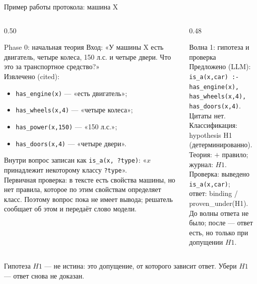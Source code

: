 \documentclass[aspectratio=169,11pt]{beamer}
\newcommand{\Logos}[1]{\textcolor{logoscolor}{#1}}
\newcommand{\Hyp}[1]{\textcolor{hypocolor}{#1}}
\begin{document}
\begin{frame}[shrink=4]{Пример работы протокола: машина X}
  \footnotesize
  \begin{columns}[T,onlytextwidth]
    \begin{column}{0.50\textwidth}
      \begin{block}{Phase 0: начальная теория}
        Вход: «У машины X есть двигатель, четыре колеса,
        150 л.с. и четыре двери. Что это за транспортное средство?»\\[1mm]
        Извлечено (\Logos{cited}):
        \begin{itemize}
          \item \texttt{has\_engine(x)} — «есть двигатель»;
          \item \texttt{has\_wheels(x,4)} — «четыре колеса»;
          \item \texttt{has\_power(x,150)} — «150 л.с.»;
          \item \texttt{has\_doors(x,4)} — «четыре двери».
        \end{itemize}
        Внутри вопрос записан как \texttt{is\_a(x, ?type)}: «\(x\)
        принадлежит некоторому классу \texttt{?type}».\\[1mm]
        Первичная проверка: в тексте есть свойства машины, но нет правила,
        которое по этим свойствам определяет класс. Поэтому вопрос пока не
        имеет вывода; решатель сообщает об этом и передаёт слово модели.
      \end{block}
    \end{column}
    \begin{column}{0.48\textwidth}
      \begin{block}{Волна 1: гипотеза и проверка}
        Предложено (LLM):\\
        \texttt{is\_a(x,car) :- has\_engine(x),
        has\_wheels(x,4), has\_doors(x,4)}.\\
        Цитаты нет.\\[1mm]
        Классификация: \Hyp{hypothesis H1} (детерминированно).\\
        Теория: \(+\) правило; журнал: \(H1\).\\[1mm]
        Проверка: выведено \texttt{is\_a(x,car)};\\
        ответ: \Hyp{binding / proven\_under(H1)}.\\[1mm]
        До волны ответа не было; после — ответ есть, но только при
        допущении \(H1\).
      \end{block}
    \end{column}
  \end{columns}

  \vspace{1mm}
  {\footnotesize Гипотеза \(H1\) — не истина: это допущение, от которого
  зависит ответ. Убери \(H1\) — ответ снова не доказан.}
\end{frame}
\end{document}
